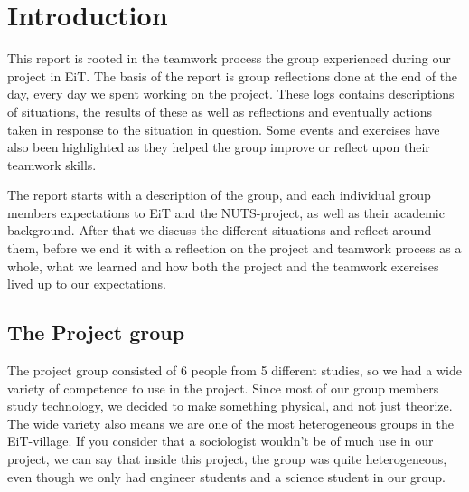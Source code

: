 \chapter{Introduction}
\label{chap:introduction}
This report is rooted in the teamwork process the group experienced during our project in EiT. The basis of the report is group reflections done at the end of the day, every day we spent working on the project. These logs contains descriptions of situations, the results of these as well as reflections and eventually actions taken in response to the situation in question. Some events and exercises have also been highlighted as they helped the group improve or reflect upon their teamwork skills.

The report starts with a description of the group, and each individual group members expectations to EiT and the NUTS-project, as well as their academic background. After that we discuss the different situations and reflect around them, before we end it with a reflection on the project and teamwork process as a whole, what we learned and how both the project and the teamwork exercises lived up to our expectations.
\section{The Project group}
The project group consisted of 6 people from 5 different studies, so we had a wide variety of competence to use in the project. Since most of our group members study technology, we decided to make something physical, and not just theorize. The wide variety also means we are one of the most heterogeneous groups in the EiT-village. If you consider that a sociologist wouldn't be of much use in our project, we can say that inside this project, the group was quite heterogeneous, even though we only had engineer students and a science student in our group. 

